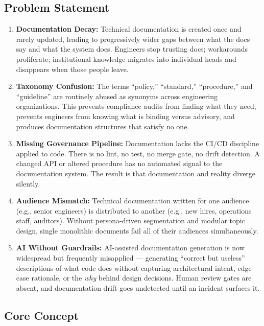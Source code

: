 \documentclass[11pt,letterpaper]{article}
\begin{document}
\subsection{Problem Statement}

\begin{enumerate}[leftmargin=*, label=\textbf{P\arabic*.}]

\item \textbf{Documentation Decay:} Technical documentation is created once and rarely updated, leading to progressively wider gaps between what the docs say and what the system does. Engineers stop trusting docs; workarounds proliferate; institutional knowledge migrates into individual heads and disappears when those people leave.

\item \textbf{Taxonomy Confusion:} The terms ``policy,'' ``standard,'' ``procedure,'' and ``guideline'' are routinely abused as synonyms across engineering organizations. This prevents compliance audits from finding what they need, prevents engineers from knowing what is binding versus advisory, and produces documentation structures that satisfy no one.

\item \textbf{Missing Governance Pipeline:} Documentation lacks the CI/CD discipline applied to code. There is no lint, no test, no merge gate, no drift detection. A changed API or altered procedure has no automated signal to the documentation system. The result is that documentation and reality diverge silently.

\item \textbf{Audience Mismatch:} Technical documentation written for one audience (e.g., senior engineers) is distributed to another (e.g., new hires, operations staff, auditors). Without persona-driven segmentation and modular topic design, single monolithic documents fail all of their audiences simultaneously.

\item \textbf{AI Without Guardrails:} AI-assisted documentation generation is now widespread but frequently misapplied --- generating ``correct but useless'' descriptions of what code does without capturing architectural intent, edge case rationale, or the \emph{why} behind design decisions. Human review gates are absent, and documentation drift goes undetected until an incident surfaces it.

\end{enumerate}

\subsection{Core Concept}
\end{document}
